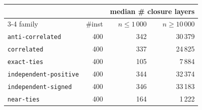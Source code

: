 \begin{tabular}{@{}lrrr@{}}
\toprule
 &  & \multicolumn{2}{c}{median \# closure layers} \\
\cmidrule(l){3-4}
family & \#inst & $n\le 1\,000$ & $n\ge 10\,000$ \\
\midrule
\texttt{anti-correlated} & 400 & 342 & 30\,379 \\
\texttt{correlated} & 400 & 337 & 24\,825 \\
\texttt{exact-ties} & 400 & 105 & 7\,884 \\
\texttt{independent-positive} & 400 & 344 & 32\,374 \\
\texttt{independent-signed} & 400 & 346 & 33\,183 \\
\texttt{near-ties} & 400 & 164 & 1\,222 \\
\bottomrule
\end{tabular}
